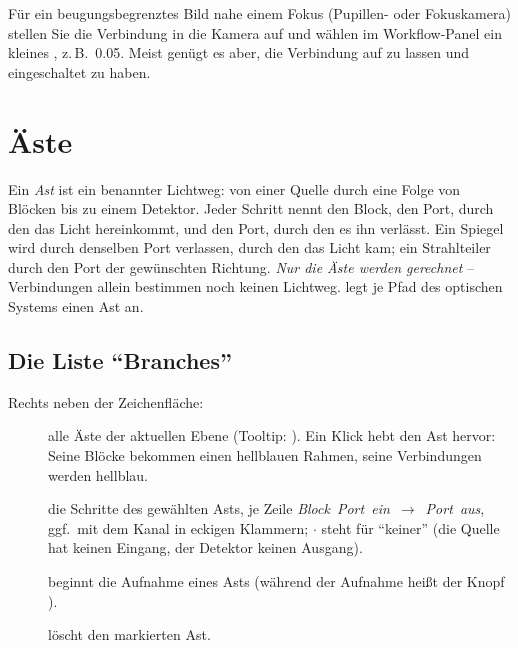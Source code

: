 \begin{tipp}
Für ein beugungsbegrenztes Bild nahe einem Fokus (Pupillen- oder Fokuskamera) stellen Sie die
Verbindung in die Kamera auf  und wählen im Workflow-Panel ein kleines
, z.\,B.\ 0.05. Meist genügt es aber, die Verbindung auf
 zu lassen und  eingeschaltet zu haben.
\end{tipp}

\section{Äste}\label{sec:workflow-aeste}

Ein \emph{Ast} ist ein benannter Lichtweg: von einer Quelle durch eine Folge von Blöcken bis zu
einem Detektor. Jeder Schritt nennt den Block, den Port, durch den das Licht hereinkommt, und den
Port, durch den es ihn verlässt. Ein Spiegel wird durch denselben Port verlassen, durch den das
Licht kam; ein Strahlteiler durch den Port der gewünschten Richtung. \emph{Nur die Äste werden
gerechnet} – Verbindungen allein bestimmen noch keinen Lichtweg.  legt
je Pfad des optischen Systems einen Ast an.

\subsection{Die Liste \enquote{Branches}}

Rechts neben der Zeichenfläche:

\begin{description}
  \item[] alle Äste der aktuellen Ebene (Tooltip: ). Ein Klick hebt den Ast hervor: Seine Blöcke
        bekommen einen hellblauen Rahmen, seine Verbindungen werden hellblau.
  \item[] die Schritte des gewählten Asts, je Zeile
        \textit{Block}\code{:}~\textit{Port~ein}~$\to$~\textit{Port~aus}, ggf.\ mit dem
        Kanal in eckigen Klammern; $\cdot$ steht für \enquote{keiner} (die Quelle hat keinen
        Eingang, der Detektor keinen Ausgang).
  \item[] beginnt die Aufnahme eines Asts (während der Aufnahme heißt der Knopf
        ).
  \item[] löscht den markierten Ast.
\end{description}

